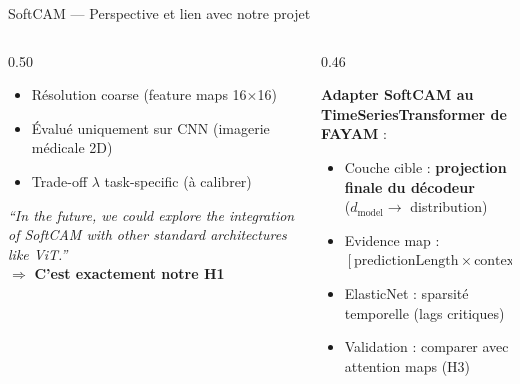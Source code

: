 \documentclass[10pt]{beamer}
\begin{document}
\begin{frame}{SoftCAM --- Perspective et lien avec notre projet}
  \begin{columns}
    \begin{column}{0.50\textwidth}
      \begin{tcolorbox}[
        colback=red!3, colframe=red!60!black,
        arc=2mm, boxrule=0.5pt, fonttitle=\bfseries,
        title={Limites identifiées}]
        \begin{itemize}
          \item Résolution coarse (feature maps 16$\times$16)
          \item Évalué uniquement sur CNN (imagerie médicale 2D)
          \item Trade-off $\lambda$ task-specific (à calibrer)
        \end{itemize}
      \end{tcolorbox}
      \begin{tcolorbox}[
        colback=blue!3, colframe=blue!40!black,
        arc=2mm, boxrule=0.5pt, fonttitle=\bfseries,
        title={Porte ouverte (p. 10)}]
        \textit{``In the future, we could explore the integration of SoftCAM
        with other standard architectures like ViT.''}\\[4pt]
        $\Rightarrow$ \textbf{C'est exactement notre H1}
      \end{tcolorbox}
    \end{column}
    \begin{column}{0.46\textwidth}
      \begin{tcolorbox}[
        colback=green!3, colframe=green!40!black,
        arc=2mm, boxrule=0.5pt, fonttitle=\bfseries,
        title={Notre transposition --- H1}]
        \textbf{Adapter SoftCAM au TimeSeriesTransformer de FAYAM} :
        \begin{itemize}
          \item Couche cible : \textbf{projection finale du décodeur}\\
                ($d_{\text{model}} \to$ distribution)
          \item Evidence map : $[\text{predictionLength} \times \text{contextLength}]$
          \item ElasticNet : sparsité temporelle (lags critiques)
          \item Validation : comparer avec attention maps (H3)
        \end{itemize}
      \end{tcolorbox}
    \end{column}
  \end{columns}
\end{frame}
\end{document}
